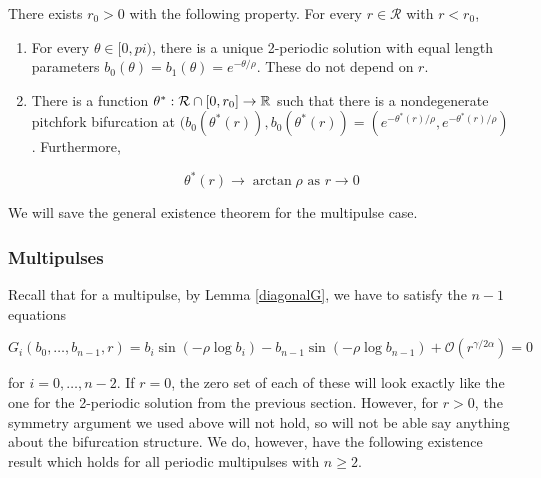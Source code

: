 \documentclass[thesis.tex]{subfiles}
\begin{document}
\begin{theorem}\label{2pulsebifurcation}
There exists $r_0 > 0$ with the following property. For every $r \in \mathcal{R}$ with $r < r_0$,
\begin{enumerate}
	\item For every $\theta \in [0, pi)$, there is a unique 2-periodic solution with equal length parameters $b_0(\theta) = b_1(\theta) = e^{-\theta/\rho}$. These do not depend on $r$.

	\item There is a function $\theta^*: \mathcal{R} \cap [0, r_0] \rightarrow {\mathbb R}$ such that there is a nondegenerate pitchfork bifurcation at $(b_0(\theta^*(r)),b_0(\theta^*(r)) = (e^{-\theta^*(r)/\rho}, e^{-\theta^*(r)/\rho})$. Furthermore, 

	\begin{equation*}
	\theta^*(r) \rightarrow \arctan \rho \text{ as } r \rightarrow 0
	\end{equation*}
\end{enumerate}
\end{theorem}

We will save the general existence theorem for the multipulse case.

\subsubsection{Multipulses}

Recall that for a multipulse, by Lemma \ref{diagonalG}, we have to satisfy the $n-1$ equations

\begin{equation*}
G_i(b_0, \dots, b_{n-1}, r) = b_i \sin \left( -\rho \log b_i \right) - b_{n-1} \sin \left( -\rho \log b_{n-1} \right) + \mathcal{O}(r^{\gamma / 2 \alpha}) = 0
\end{equation*}

for $i = 0, \dots, n-2$. If $r = 0$, the zero set of each of these will look exactly like the one for the 2-periodic solution from the previous section. However, for $r > 0$, the symmetry argument we used above will not hold, so will not be able say anything about the bifurcation structure. We do, however, have the following existence result which holds for all periodic multipulses with $n \geq 2$.
\end{document}
